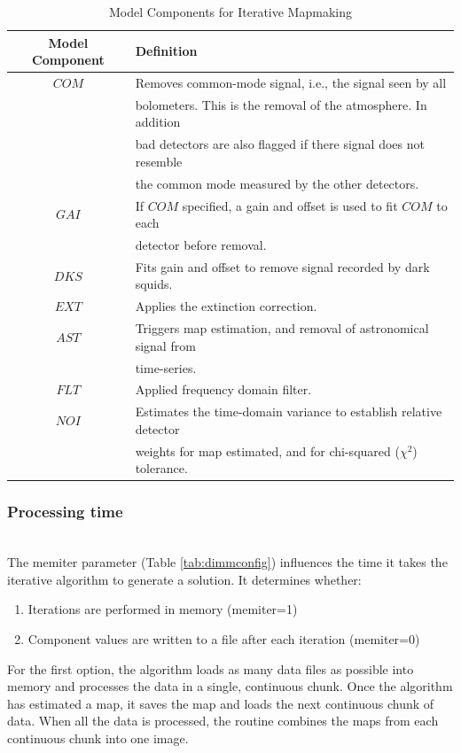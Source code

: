 \documentclass[twoside,11pt]{article}
\renewcommand{\_}{\texttt{\symbol{95}}}
\begin{document}
\begin{table}
\begin{tabular}{cl}
 Model Component & Definition \\
\hline
$COM$ & Removes common-mode signal, i.e., the signal seen by all \\
      & bolometers. This is the removal of the atmosphere. In addition \\
      & bad detectors are also flagged if there signal does not resemble \\
      & the common mode measured by the other detectors. \\
$GAI$ & If $COM$ specified, a gain and offset is used to fit $COM$ to each \\
      & detector before removal. \\
$DKS$ & Fits gain and offset to remove signal recorded by dark squids. \\  
$EXT$ & Applies the extinction correction. \\
$AST$ & Triggers map estimation, and removal of astronomical signal from \\
      & time-series. \\
$FLT$ & Applied frequency domain filter. \\
$NOI$ & Estimates the time-domain variance to establish relative detector \\ 
      & weights for map estimated, and for chi-squared ($\chi^2$) tolerance. \\
\hline
\end{tabular}
\caption{Model Components for Iterative Mapmaking}
\label{tab:dimm_components}
\end{table}

\subsubsection{Processing time} \ \\

The memiter parameter (Table \ref{tab:dimmconfig}) influences the time
it takes the iterative algorithm to generate a solution. It determines
whether:
\begin{enumerate}
\item Iterations are performed in memory (memiter=1)
\item Component values are written to a file after each iteration
  (memiter=0)
\end{enumerate}

For the first option, the algorithm loads as many data files as
possible into memory and processes the data in a single, continuous
chunk. Once the algorithm has estimated a map, it saves the map and
loads the next continuous chunk of data. When all the data is
processed, the routine combines the maps from each continuous chunk
into one image.
\end{document}

